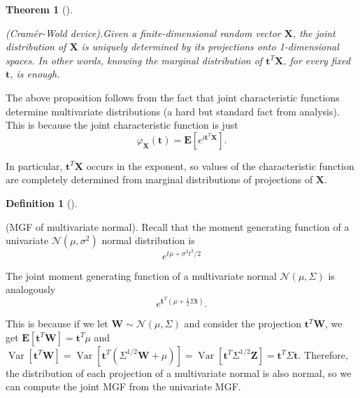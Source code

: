\documentclass[
  letterpaper,
  DIV=11,
  numbers=noendperiod]{scrreprt}
\theoremstyle{plain}
\newtheorem{theorem}{Theorem}[chapter]
\theoremstyle{definition}
\newtheorem{definition}{Definition}[chapter]
\theoremstyle{remark}
\begin{document}

\leavevmode{}%
\begin{theorem}[]\label{thm-moment-MVN}

(Cramér-Wold device).Given a finite-dimensional random vector
\(\mathbf{X}\), the joint distribution of \(\mathbf{X}\) is uniquely
determined by its projections onto 1-dimensional spaces. In other words,
knowing the marginal distribution of \(\mathbf{t}^T \mathbf{X}\), for
every fixed \(\mathbf{t}\), is enough.

\end{theorem}

The above proposition follows from the fact that joint characteristic
functions determine multivariate distributions (a hard but standard fact
from analysis). This is because the joint characteristic function is
just \[
\varphi_{\mathbf{X}}(\mathbf{t})=\mathbf{E}\left[e^{i \mathbf{t}^T \mathbf{X}}\right] .
\]

In particular, \(\mathbf{t}^T \mathbf{X}\) occurs in the exponent, so
values of the characteristic function are completely determined from
marginal distributions of projections of \(\mathbf{X}\).

\leavevmode{}%
\begin{definition}[]\label{def-mgf-mvn}

(MGF of multivariate normal). Recall that the moment generating function
of a univariate \(\mathcal{N}\left(\mu, \sigma^2\right)\) normal
distribution is \[
e^{t \mu+\sigma^2 t^2 / 2}
\]

The joint moment generating function of a multivariate normal
\(\mathcal{N}(\mu, \Sigma)\) is analogously \[
e^{\mathbf{t}^T\left(\mu+\frac{1}{2} \Sigma \mathbf{t}\right)} .
\]

This is because if we let \(\mathbf{W} \sim \mathcal{N}(\mu, \Sigma)\)
and consider the projection \(\mathbf{t}^T \mathbf{W}\), we get
\(\mathbf{E}\left[\mathbf{t}^T \mathbf{W}\right]=\mathbf{t}^T \mu\) and
\(\operatorname{Var}\left[\mathbf{t}^T \mathbf{W}\right]=\operatorname{Var}\left[\mathbf{t}^T\left(\Sigma^{1 / 2} \mathbf{W}+\mu\right)\right]=\operatorname{Var}\left[\mathbf{t}^T \Sigma^{1 / 2} \mathbf{Z}\right]=\mathbf{t}^T \Sigma \mathbf{t}\).
Therefore, the distribution of each projection of a multivariate normal
is also normal, so we can compute the joint MGF from the univariate MGF.

\end{definition}
\end{document}
